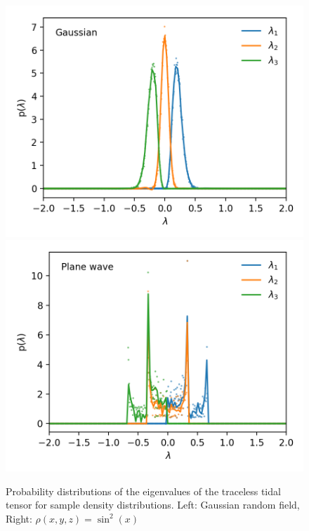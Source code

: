 \documentclass[a4paper,11pt]{article}
\begin{document}
\begin{figure}[!htb]

  \includegraphics[trim={1cm 0 0 0},scale=0.76]{prob_distro_gaussian.png}
\endminipage\hfill
{}%
  \includegraphics[trim={0cm 0 1cm 0},scale=0.76]{prob_distro_plane_wave.png}

\endminipage
  \caption{Probability distributions of the eigenvalues of the traceless tidal tensor for sample density distributions. Left: Gaussian random field, Right: $\rho(x,y,z) = \sin^2{(x)}$ }\label{fig:gaussian_plane_wave}
\end{figure}
\end{document}
